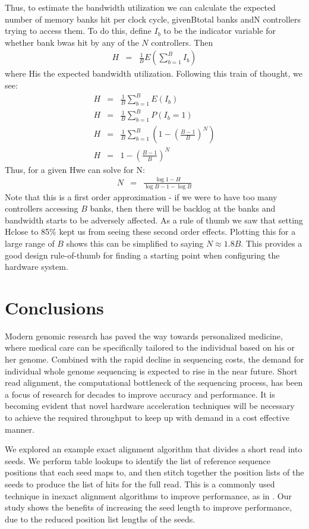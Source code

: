 \documentclass[11pt]{article}
\begin{document}
Thus, to estimate the bandwidth utilization we can calculate the expected number of memory banks hit per clock cycle, givenBtotal banks andN controllers trying to access them. To do this, define $I_b$ to be the indicator variable for whether bank bwas hit by any of the $N$ controllers. Then
\begin{eqnarray*}
H&=&\frac{1}{B}E(\sum_{b=1}^{B} I_b)
\end{eqnarray*}
where His the expected bandwidth utilization. Following this train of thought, we see:
\begin{eqnarray*}
H&=&\frac{1}{B} \sum_{b=1}^{B} E(I_b) \\
H&=&\frac{1}{B} \sum_{b=1}^{B} P(I_b = 1) \\
H&=&\frac{1}{B} \sum_{b=1}^{B} (1-(\frac{B-1}{B})^N) \\
H&=& 1-(\frac{B-1}{B})^N
\end{eqnarray*}
Thus, for a given Hwe can solve for N:
\begin{eqnarray*}
N&=&\frac{\log{1-H}}{\log{B-1}-\log{B}}
\end{eqnarray*}
Note that this is a first order approximation - if we were to have too many controllers accessing $B$ banks, then there will be backlog at the banks and bandwidth starts to be adversely affected. As a rule of thumb we saw that setting Hclose to 85\% kept us from seeing these second order effects. Plotting this for a large range of $B$ shows this can be simplified to saying $N \approx 1.8B$. This provides a good design rule-of-thumb for finding a starting point when configuring the hardware system.

\section{Conclusions}

Modern genomic research has paved the way towards personalized medicine, where medical care can be specifically tailored to the individual based on his or her genome.  Combined with the rapid decline in sequencing costs, the demand for individual whole genome sequencing is expected to rise in the near future.  Short read alignment, the computational bottleneck of the sequencing process, has been a focus of research for decades to improve accuracy and performance.  It is becoming evident that novel hardware acceleration techniques will be necessary to achieve the required throughput to keep up with demand in a cost effective manner.


	We explored an example exact alignment algorithm that divides a short read into seeds. We perform table lookups to identify the list of reference sequence positions that each seed maps to, and then stitch together the position lists of the seeds to produce the list of hits for the full read.  This is a commonly used technique in inexact alignment algorithms to improve performance, as in \cite{ning2001ssaha, toh2009basic, zaharia2011faster}.  Our study shows the benefits of increasing the seed length to improve performance, due to the reduced position list lengths of the seeds.
\end{document}

